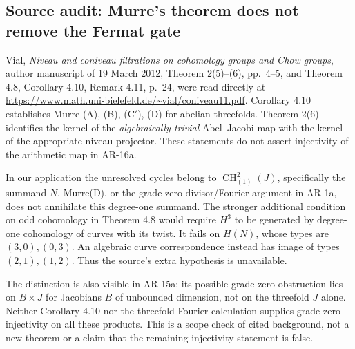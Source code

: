 \subsection*{Source audit: Murre's theorem does not remove the Fermat gate}

Vial, \emph{Niveau and coniveau filtrations on cohomology groups
and Chow groups}, author manuscript of 19 March 2012,
Theorem 2(5)--(6), pp.~4--5, and Theorem 4.8,
Corollary 4.10, Remark 4.11, p.~24, were read directly at
\url{https://www.math.uni-bielefeld.de/~vial/coniveau11.pdf}.
Corollary 4.10 establishes Murre (A), (B), (C$'$), (D) for abelian
threefolds. Theorem 2(6) identifies the kernel of the
\emph{algebraically trivial} Abel--Jacobi map with the kernel
of the appropriate niveau projector. These statements do not
assert injectivity of the arithmetic map in AR-16a.

In our application the unresolved cycles belong to
$\operatorname{CH}^2_{(1)}(J)$, specifically the summand $N$.
Murre(D), or the grade-zero divisor/Fourier argument in AR-1a,
does not annihilate this degree-one summand. The stronger
additional condition on odd cohomology in Theorem 4.8 would require
$H^3$ to be generated by degree-one cohomology of curves with its
twist. It fails on $H(N)$, whose types are $(3,0),(0,3)$.
An algebraic curve correspondence instead has image of types
$(2,1),(1,2)$. Thus the source's extra hypothesis is unavailable.

The distinction is also visible in AR-15a: its possible
grade-zero obstruction lies on $B\times J$ for Jacobians $B$
of unbounded dimension, not on the threefold $J$ alone.
Neither Corollary 4.10 nor the threefold Fourier calculation
supplies grade-zero injectivity on all these products.
This is a scope check of cited background, not a new theorem
or a claim that the remaining injectivity statement is false.
